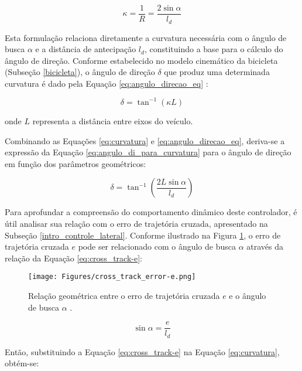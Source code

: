 \begin{equation}\label{eq:curvatura}
\kappa = \frac{1}{R} = \frac{2\sin\alpha}{l_d}
\end{equation}

Esta formulação relaciona diretamente a curvatura necessária com o ângulo de busca $\alpha$ e a distância de antecipação $l_d$, constituindo a base para o cálculo do ângulo de direção. Conforme estabelecido no modelo cinemático da bicicleta (Subseção \ref{bicicleta}), o ângulo de direção $\delta$ que produz uma determinada curvatura é dado pela Equação \ref{eq:angulo_direcao_eq} \cite[p.~10]{snider2009automatic}:

\begin{equation} \label{eq:angulo_direcao_eq}
\delta = \tan^{-1}(\kappa L)
\end{equation}

onde $L$ representa a distância entre eixos do veículo.

Combinando as Equações \ref{eq:curvatura} e \ref{eq:angulo_direcao_eq}, deriva-se a expressão da Equação \ref{eq:angulo_di_para_curvatura} para o ângulo de direção em função dos parâmetros geométricos:

\begin{equation}\label{eq:angulo_di_para_curvatura}
\delta = \tan^{-1} \left( \frac{2L \sin \alpha}{l_d} \right)
\end{equation}

Para aprofundar a compreensão do comportamento dinâmico deste controlador, é útil analisar sua relação com o erro de trajetória cruzada, apresentado na Subseção \ref{intro_controle_lateral}. Conforme ilustrado na Figura \ref{cross_track_error-e}, o erro de trajetória cruzada $e$ pode ser relacionado com o ângulo de busca $\alpha$ através da relação da Equação \ref{eq:cross_track-e}:

\begin{figure}[H]
\centering
\texttt{[image: Figures/cross\_track\_error-e.png]}
\caption{Relação geométrica entre o erro de trajetória cruzada $e$ e o ângulo de busca $\alpha$ \cite[Week 6 - Lesson 2: Geometric Lateral Control - Pure Pursuit. ~3min52s]{University_of_Toronto2018-fe}.}
\label{cross_track_error-e}
\end{figure}

\begin{equation}\label{eq:cross_track-e}
\sin \alpha = \frac{e}{l_d}
\end{equation}

Então, substituindo a Equação \ref{eq:cross_track-e} na Equação \ref{eq:curvatura}, obtém-se:

